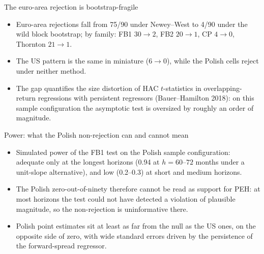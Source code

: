 \documentclass[aspectratio=169,11pt]{beamer}
\begin{document}
\begin{frame}{The euro-area rejection is bootstrap-fragile}
  \begin{itemize}
    \item Euro-area rejections fall from 75/90 under Newey--West to 4/90 under
          the wild block bootstrap; by family: FB1 $30\!\to\!2$,
          FB2 $20\!\to\!1$, CP $4\!\to\!0$, Thornton $21\!\to\!1$.
    \item The US pattern is the same in miniature ($6\!\to\!0$), while the
          Polish cells reject under neither method.
    \item The gap quantifies the size distortion of HAC $t$-statistics in
          overlapping-return regressions with persistent regressors
          (Bauer--Hamilton 2018): on this sample configuration the asymptotic
          test is oversized by roughly an order of magnitude.
  \end{itemize}
\end{frame}

\begin{frame}{Power: what the Polish non-rejection can and cannot mean}
  \begin{itemize}
    \item Simulated power of the FB1 test on the Polish sample configuration:
          adequate only at the longest horizons (0.94 at $h=60$--$72$ months
          under a unit-slope alternative), and low (0.2--0.3) at short and
          medium horizons.
    \item The Polish zero-out-of-ninety therefore cannot be read as support
          for PEH: at most horizons the test could not have detected a
          violation of plausible magnitude, so the non-rejection is
          uninformative there.
    \item Polish point estimates sit at least as far from the null as the US
          ones, on the opposite side of zero, with wide standard errors driven
          by the persistence of the forward-spread regressor.
  \end{itemize}
\end{frame}
\end{document}
